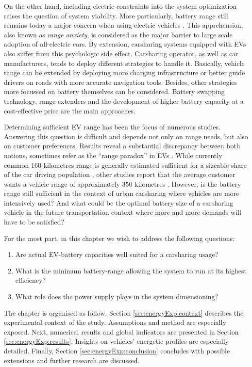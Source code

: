 \begin{bibunit}[ieeetr]
On the other hand, including electric constraints into the system optimization raises the question of system viability.
More particularly, battery range still remains today a major concern when using electric vehicles \cite{franke_experiencing_2012}.
This apprehension, also known as \emph{range anxiety}, is considered as the major barrier to large scale adoption of all-electric cars.
By extension, carsharing systems equipped with EVs also suffer from this psychologic side effect.
Carsharing operator, as well as car manufacturers, tends to deploy different strategies to handle it.
Basically, vehicle range can be extended by deploying more charging infrastructure or better guide drivers on roads with more accurate navigation tools.
Besides, other strategies more focussed on battery themselves can be considered.
Battery swapping technology, range extenders and the development of higher battery capacity at a cost-effective price are the main approaches.

\medskip
Determining sufficient EV range has been the focus of numerous studies.
Answering this question is difficult and depends not only on range needs, but also on customer preferences.
Results reveal a substantial discrepancy between both notions, sometimes refer as the ``range paradox'' in EVs \cite{franke_what_2013}.
While currently common $160$-kilometres range is generally estimated sufficient for a sizeable share of the car driving population \cite{pearre_electric_2011, chlond_market_2012}, other studies report that the average customer wants a vehicle range of approximately $350$ kilometres \cite{bunzeck_preferences_2011}.
However, is the battery range still sufficient in the context of urban carsharing where vehicles are more intensively used?
And what could be the optimal battery size of a carsharing vehicle in the future transportation context where more and more demands will have to be satisfied?

\medskip
For the most part, in this chapter we wish to address the following questions:
\begin{enumerate}
\item Are actual EV-battery capacities well suited for a carsharing usage?
\item What is the minimum battery-range allowing the system to run at its highest efficiency?
\item What role does the power supply plays in the system dimensioning?
\end{enumerate}
The chapter is organised as follow.
Section \ref{sec:energyExp:context} describes the experimental context of the study.
Assumptions and method are especially exposed.
Next, numerical results and global indicators are presented in Section \ref{sec:energyExp:results}.
Insights on vehicles' energetic profiles are especially detailed.
Finally, Section \ref{sec:energyExp:conclusion} concludes with possible extensions and further research are discussed.


\end{bibunit}
